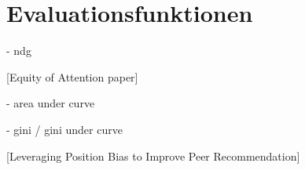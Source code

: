 \chapter{Evaluationsfunktionen}


- ndg

[Equity of Attention paper]

- area under curve

- gini / gini under curve

[Leveraging Position Bias to Improve Peer
Recommendation]

\cite{Lerman2014} \cite{Salganik2006854}


